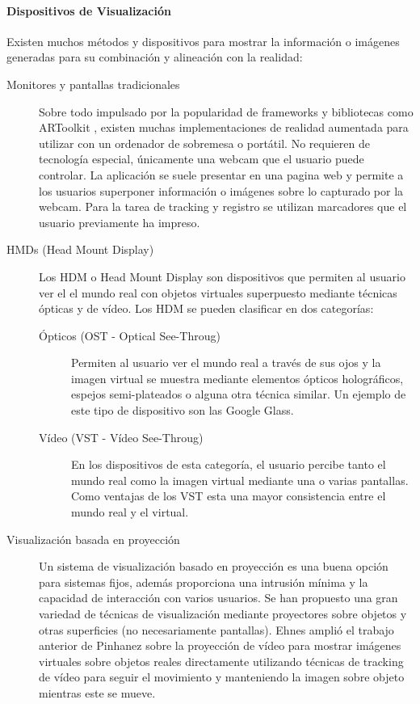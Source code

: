 \paragraph{Dispositivos  de Visualización}
Existen  muchos métodos y dispositivos para mostrar la información o imágenes generadas para su combinación y alineación con la realidad: 
\begin{description}
\item[Monitores y pantallas tradicionales]
  Sobre todo impulsado por la popularidad de frameworks y bibliotecas como ARToolkit \cite{Kato}, existen muchas implementaciones de realidad aumentada para utilizar con un ordenador de sobremesa o portátil. No requieren de tecnología especial, únicamente una webcam que el usuario puede controlar. La aplicación se suele presentar en una pagina web y permite a los usuarios superponer información o imágenes sobre lo capturado por la webcam. Para la tarea de tracking y registro se utilizan marcadores que el usuario previamente ha impreso.
  
\item[HMDs (Head Mount Display)] Los HDM o Head Mount Display son dispositivos que permiten al usuario ver el el mundo real con objetos virtuales superpuesto mediante técnicas ópticas y de vídeo. Los HDM se pueden clasificar en dos categorías:
  \begin{description}
  \item[Ópticos (OST - Optical See-Throug)] Permiten al usuario ver el mundo real a través de sus ojos y la imagen virtual se muestra mediante elementos ópticos holográficos, espejos semi-plateados o alguna otra técnica similar. Un ejemplo de este tipo de dispositivo son las Google Glass.
    
  \item[Vídeo (VST - Vídeo See-Throug)] En los dispositivos de esta categoría, el usuario percibe tanto el mundo real como la imagen virtual mediante una o varias pantallas. Como ventajas de los VST esta una mayor consistencia entre el mundo real y el virtual.
  \end{description}
  
\item[Visualización basada en proyección]
  Un sistema de visualización basado en proyección es una buena opción para sistemas fijos, además proporciona una intrusión mínima y la capacidad de interacción con varios usuarios.
  Se han propuesto una gran variedad de técnicas de visualización mediante proyectores sobre objetos y otras superficies (no necesariamente pantallas). Ehnes \cite{Ehnes} amplió el trabajo anterior de Pinhanez \cite{Pinhanez} sobre la proyección de vídeo para mostrar imágenes virtuales sobre objetos reales directamente utilizando técnicas de tracking de vídeo para seguir el movimiento y manteniendo la imagen sobre objeto mientras este se mueve.
  

\end{description}
